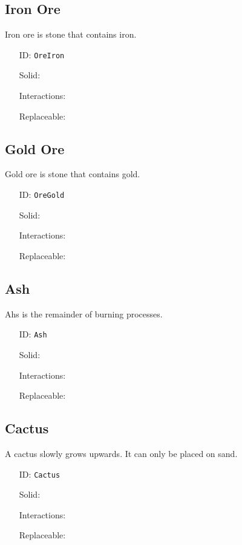 \subsection{Iron Ore}\label{subsec:blocks_iron ore}
Iron ore is stone that contains iron.
\newline
\begin{itemize}[nosep]
    \item[ID:] \texttt{OreIron}
    \item[Solid:]  \Checkmark \item[Interactions:]  \XSolidBrush \item[Replaceable:]  \XSolidBrush
\end{itemize}

\subsection{Gold Ore}\label{subsec:blocks_gold ore}
Gold ore is stone that contains gold.
\newline
\begin{itemize}[nosep]
    \item[ID:] \texttt{OreGold}
    \item[Solid:]  \Checkmark \item[Interactions:]  \XSolidBrush \item[Replaceable:]  \XSolidBrush
\end{itemize}

\subsection{Ash}\label{subsec:blocks_ash}
Ahs is the remainder of burning processes.
\newline
\begin{itemize}[nosep]
    \item[ID:] \texttt{Ash}
    \item[Solid:]  \Checkmark \item[Interactions:]  \XSolidBrush \item[Replaceable:]  \XSolidBrush
\end{itemize}

\subsection{Cactus}\label{subsec:blocks_cactus}
A cactus slowly grows upwards. It can only be placed on sand.
\newline
\begin{itemize}[nosep]
    \item[ID:] \texttt{Cactus}
    \item[Solid:]  \Checkmark \item[Interactions:]  \XSolidBrush \item[Replaceable:]  \XSolidBrush
\end{itemize}

